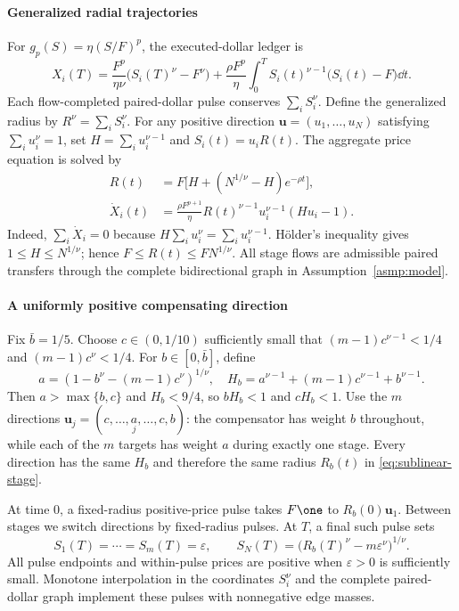 \documentclass[review,hidelinks,onefignum,onetabnum]{siamonline250211}
\begin{document}
\paragraph{Generalized radial trajectories}
For $g_p(S)=\eta(S/F)^p$, the executed-dollar ledger is
\begin{equation}\label{eq:sublinear-ledger}
X_i(T)=\frac{F^p}{\eta\nu}
\bigl(S_i(T)^\nu-F^\nu\bigr)
+\frac{\rho F^p}{\eta}\int_0^T
S_i(t)^{\nu-1}\bigl(S_i(t)-F\bigr)\dd t.
\end{equation}
Each flow-completed paired-dollar pulse conserves
$\sum_iS_i^\nu$. Define the generalized radius by
$R^\nu=\sum_iS_i^\nu$. For any positive direction
$\bm u=(u_1,\ldots,u_N)$ satisfying $\sum_i u_i^\nu=1$,
set $H=\sum_i u_i^{\nu-1}$ and $S_i(t)=u_iR(t)$.
The aggregate price equation is solved by
\begin{equation}\label{eq:sublinear-stage}
\begin{aligned}
R(t)&=F\bigl[H+(N^{1/\nu}-H)e^{-\rho t}\bigr],\\
\dot X_i(t)&=
\frac{\rho F^{p+1}}{\eta}
R(t)^{\nu-1}u_i^{\nu-1}(Hu_i-1).
\end{aligned}
\end{equation}
Indeed, $\sum_i\dot X_i=0$ because
$H\sum_i u_i^\nu=\sum_i u_i^{\nu-1}$.
H\"older's inequality gives $1\le H\le N^{1/\nu}$;
hence $F\le R(t)\le FN^{1/\nu}$. All stage flows
are admissible paired transfers through the complete
bidirectional graph in Assumption~\ref{asmp:model}.

\paragraph{A uniformly positive compensating direction}
Fix $\bar b=1/5$. Choose $c\in(0,1/10)$ sufficiently
small that $(m-1)c^{\nu-1}<1/4$ and
$(m-1)c^\nu<1/4$. For $b\in[0,\bar b]$, define
\[
a=(1-b^\nu-(m-1)c^\nu)^{1/\nu},\quad
H_b=a^{\nu-1}+(m-1)c^{\nu-1}+b^{\nu-1}.
\]
Then $a>\max\{b,c\}$ and $H_b<9/4$,
so $bH_b<1$ and $cH_b<1$. Use the $m$
directions
$\bm u_j=(c,\ldots,\underset{j}{a},\ldots,c,b)$:
the compensator has weight $b$ throughout, while
each of the $m$ targets has weight $a$ during
exactly one stage. Every direction has the same $H_b$
and therefore the same radius $R_b(t)$ in
\eqref{eq:sublinear-stage}.

At time $0$, a fixed-radius positive-price pulse
takes $F\one$ to $R_b(0)\bm u_1$. Between stages
we switch directions by fixed-radius pulses.
At $T$, a final such pulse sets
\[
S_1(T)=\cdots=S_m(T)=\varepsilon,\qquad
S_N(T)=\bigl(R_b(T)^\nu-m\varepsilon^\nu\bigr)^{1/\nu}.
\]
All pulse endpoints and within-pulse prices are
positive when $\varepsilon>0$ is sufficiently small.
Monotone interpolation in the coordinates $S_i^\nu$
and the complete paired-dollar graph implement
these pulses with nonnegative edge masses.
\end{document}
